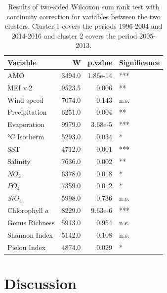 \documentclass[draft]{agujournal2019}
\begin{document}
    
    \begin{table}
    \caption{Results of two-sided Wilcoxon sum rank test with continuity correction for variables between the two clusters. Cluster 1 covers the periods 1996-2004 and 2014-2016 and cluster 2 covers the period 2005-2013.}
    \centering
    \begin{tabular}[t]{lrrl}
    \toprule
    Variable & W & p.value & Significance\\
    \midrule
    AMO & 3494.0 & 1.86e-14 & ***\\
    MEI v.2 & 9523.5 & 0.006 & **\\
    Wind speed & 7074.0 & 0.143 & n.s.\\
    Precipitation & 6251.0 & 0.004 & **\\
    Evaporation & 9979.0 & 3.68e-5 & ***\\
    \addlinespace
    21 °C Isotherm & 5293.0 & 0.034 & *\\
    SST & 4712.0 & 0.001 & ***\\
    Salinity & 7636.0 & 0.002 & **\\
    $NO_3$ & 6378.0 & 0.018 & *\\
    $PO_4$ & 7359.0 & 0.012 & *\\
    $SiO_4$ & 5998.0 & 0.736 & n.s.\\
    \addlinespace
    Chlorophyll $a$ & 8229.0 & 9.63e-6 & ***\\
    Genus Richness & 5913.0 & 0.954 & n.s.\\
    Shannon Index & 5142.0 & 0.108 & n.s.\\
    Pielou Index & 4874.0 & 0.029 & *\\
    \bottomrule
    \end{tabular}
    
    \label{tab:ClustCompWilcox}
    \end{table}
    


\section{Discussion}
\end{document}
